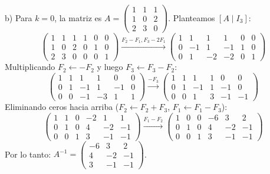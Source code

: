 \documentclass[11pt,letterpaper]{article}
\theoremstyle{definition}
\theoremstyle{plain}
\begin{document}
b) Para $k=0$, la matriz es $A = \begin{pmatrix} 1 & 1 & 1 \\ 1 & 0 & 2 \\ 2 & 3 & 0 \end{pmatrix}$.
Planteamos $[A \mid I_3]$:
\[
\left(\begin{array}{ccc|ccc}
1 & 1 & 1 & 1 & 0 & 0 \\
1 & 0 & 2 & 0 & 1 & 0 \\
2 & 3 & 0 & 0 & 0 & 1
\end{array}\right) \xrightarrow{F_2-F_1, F_3-2F_1}
\left(\begin{array}{ccc|ccc}
1 & 1 & 1 & 1 & 0 & 0 \\
0 & -1 & 1 & -1 & 1 & 0 \\
0 & 1 & -2 & -2 & 0 & 1
\end{array}\right)
\]
Multiplicando $F_2 \leftarrow -F_2$ y luego $F_3 \leftarrow F_3 - F_2$:
\[
\left(\begin{array}{ccc|ccc}
1 & 1 & 1 & 1 & 0 & 0 \\
0 & 1 & -1 & 1 & -1 & 0 \\
0 & 0 & -1 & -3 & 1 & 1
\end{array}\right) \xrightarrow{-F_3}
\left(\begin{array}{ccc|ccc}
1 & 1 & 1 & 1 & 0 & 0 \\
0 & 1 & -1 & 1 & -1 & 0 \\
0 & 0 & 1 & 3 & -1 & -1
\end{array}\right)
\]
Eliminando ceros hacia arriba ($F_2 \leftarrow F_2 + F_3$, $F_1 \leftarrow F_1 - F_3$):
\[
\left(\begin{array}{ccc|ccc}
1 & 1 & 0 & -2 & 1 & 1 \\
0 & 1 & 0 & 4 & -2 & -1 \\
0 & 0 & 1 & 3 & -1 & -1
\end{array}\right) \xrightarrow{F_1 - F_2}
\left(\begin{array}{ccc|ccc}
1 & 0 & 0 & -6 & 3 & 2 \\
0 & 1 & 0 & 4 & -2 & -1 \\
0 & 0 & 1 & 3 & -1 & -1
\end{array}\right)
\]
Por lo tanto: $A^{-1} = \begin{pmatrix} -6 & 3 & 2 \\ 4 & -2 & -1 \\ 3 & -1 & -1 \end{pmatrix}$.
\end{document}
